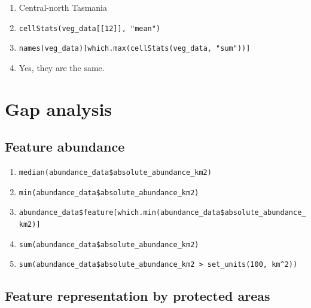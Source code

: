 \documentclass[
  12pt,
]{book}
\makeatletter
\providecommand{\tightlist}{%
  \setlength{\itemsep}{0pt}\setlength{\parskip}{0pt}}
\newenvironment{kframe}{%
\medskip{}
\setlength{\fboxsep}{.8em}
 \def\at@end@of@kframe{}%
 \ifinner\ifhmode%
  \def\at@end@of@kframe{\end{minipage}}%
  \begin{minipage}{\columnwidth}%
 \fi\fi%
 \def\FrameCommand##1{\hskip\@totalleftmargin \hskip-\fboxsep
 \colorbox{shadecolor}{##1}\hskip-\fboxsep
     \hskip-\linewidth \hskip-\@totalleftmargin \hskip\columnwidth}%
 \MakeFramed {\advance\hsize-\width
   \@totalleftmargin\z@ \linewidth\hsize
   \@setminipage}}%
 {\par\unskip\endMakeFramed%
 \at@end@of@kframe}
\newenvironment{rmdblock}[1]
  {
  \begin{itemize}
  \renewcommand{\labelitemi}{
    \raisebox{-.7\height}[0pt][0pt]{
      {\setkeys{Gin}{width=3em,keepaspectratio}\texttt{[image: images/\#1]}}
    }
  }
  \setlength{\fboxsep}{1em}
  \begin{kframe}
  \item
  }
  {
  \end{kframe}
  \end{itemize}
  }
\newenvironment{rmdanswer}
  {\begin{rmdblock}{answer}}
  {\end{rmdblock}}
\makeatother
\begin{document}
\begin{rmdanswer}
\begin{enumerate}
\def\labelenumi{\arabic{enumi}.}
\tightlist
\item
  Central-north Tasmania
\item
  \texttt{cellStats(veg\_data{[}{[}12{]}{]},\ "mean")}
\item
  \texttt{names(veg\_data){[}which.max(cellStats(veg\_data,\ "sum")){]}}
\item
  Yes, they are the same.
\end{enumerate}
\end{rmdanswer}

\hypertarget{gap-analysis-1}{%
\section{Gap analysis}\label{gap-analysis-1}}

\hypertarget{feature-abundance-1}{%
\subsection{Feature abundance}\label{feature-abundance-1}}

\begin{rmdanswer}
\begin{enumerate}
\def\labelenumi{\arabic{enumi}.}
\tightlist
\item
  \texttt{median(abundance\_data\$absolute\_abundance\_km2)}
\item
  \texttt{min(abundance\_data\$absolute\_abundance\_km2)}
\item
  \texttt{abundance\_data\$feature{[}which.min(abundance\_data\$absolute\_abundance\_km2){]}}
\item
  \texttt{sum(abundance\_data\$absolute\_abundance\_km2)}
\item
  \texttt{sum(abundance\_data\$absolute\_abundance\_km2\ \textgreater{}\ set\_units(100,\ km\^{}2))}
\end{enumerate}
\end{rmdanswer}

\hypertarget{feature-representation-by-protected-areas-1}{%
\subsection{Feature representation by protected areas}\label{feature-representation-by-protected-areas-1}}
\end{document}
